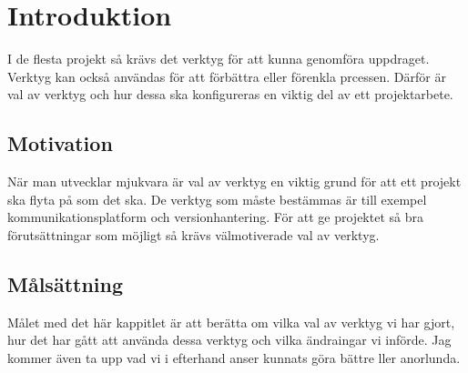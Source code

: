 

\chapter{Introduktion}
\label{cha:introduction}

I de flesta projekt så krävs det verktyg för att kunna genomföra uppdraget. Verktyg kan också användas för att förbättra eller förenkla prcessen. Därför är val av verktyg och hur dessa ska konfigureras en viktig del av ett projektarbete.


\section{Motivation}
\label{sec:motivation}



När man utvecklar mjukvara är val av verktyg en viktig grund för att ett projekt ska flyta på som det ska. De verktyg som måste bestämmas är till exempel kommunikationsplatform och versionhantering. För att ge projektet så bra förutsättningar som möjligt så krävs välmotiverade val av verktyg.



\section{Målsättning}
\label{sec:aim}

Målet med det här kappitlet är att berätta om vilka val av verktyg vi har gjort, hur det har gått att använda dessa verktyg och vilka ändraingar vi införde. Jag kommer även ta upp vad vi i efterhand anser kunnats göra bättre ller anorlunda.

